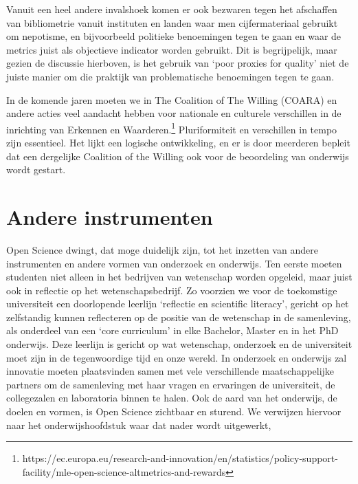 \documentclass{jote-book}
\begin{document}
	Vanuit een heel andere invalshoek komen er ook bezwaren tegen het afschaffen van bibliometrie vanuit instituten en landen waar men cijfermateriaal gebruikt om nepotisme, en bijvoorbeeld politieke benoemingen tegen te gaan en waar de metrics juist als objectieve indicator worden gebruikt. Dit is begrijpelijk, maar gezien de discussie hierboven, is het gebruik van ‘poor proxies for quality' niet de juiste manier om die praktijk van problematische benoemingen tegen te gaan.



	In de komende jaren moeten we in The Coalition of The Willing (COARA) en andere acties veel aandacht hebben voor nationale en culturele verschillen in de inrichting van Erkennen en Waarderen.\footnote{https://ec.europa.eu/research-and-innovation/en/statistics/policy-support-facility/mle-open-science-altmetrics-and-rewards} Pluriformiteit en verschillen in tempo zijn essentieel. Het lijkt een logische ontwikkeling, en er is door meerderen bepleit dat een dergelijke Coalition of the Willing ook voor de beoordeling van onderwijs wordt gestart.



	\section{Andere instrumenten}



	Open Science dwingt, dat moge duidelijk zijn, tot het inzetten van andere instrumenten en andere vormen van onderzoek en onderwijs. Ten eerste moeten studenten niet alleen in het bedrijven van wetenschap worden opgeleid, maar juist ook in reflectie op het wetenschapsbedrijf. Zo voorzien we voor de toekomstige universiteit een doorlopende leerlijn ‘reflectie en scientific literacy', gericht op het zelfstandig kunnen reflecteren op de positie van de wetenschap in de samenleving, als onderdeel van een ‘core curriculum' in elke Bachelor, Master en in het PhD onderwijs. Deze leerlijn is gericht op wat wetenschap, onderzoek en de universiteit moet zijn in de tegenwoordige tijd en onze wereld. In onderzoek en onderwijs zal innovatie moeten plaatsvinden samen met vele verschillende maatschappelijke partners om de samenleving met haar vragen en ervaringen de universiteit, de collegezalen en laboratoria binnen te halen. Ook de aard van het onderwijs, de doelen en vormen, is Open Science zichtbaar en sturend. We verwijzen hiervoor naar het onderwijshoofdstuk waar dat nader wordt uitgewerkt,
\end{document}
